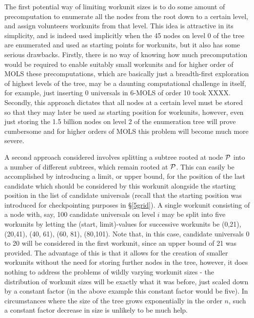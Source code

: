 The first potential way of limiting workunit sizes is to do some amount of precomputation to enumerate all the nodes from the root down to a certain level, and assign volunteers workunits from that level. This idea is attractive in its simplicity, and is indeed used implicitly when the 45 nodes on level 0 of the tree are enumerated and used as starting points for workunits, but it also has some serious drawbacks. Firstly, there is no way of knowing how much precomputation would be required to enable suitably small workunits and for higher order of MOLS these precomputations, which are basically just a breadth-first exploration of highest levels of the tree, may be a daunting computational challenge in itself, for example, just inserting 0 universals in 6-MOLS of order 10 took XXXX. Secondly, this approach dictates that all nodes at a certain level must be stored so that they may later be used as starting position for workunits, however, even just storing the 1.5 billion nodes on level 2 of the enumeration tree will prove cumbersome and for higher orders of MOLS this problem will become much more severe. %

A second approach considered involves splitting a subtree rooted at node $\mathcal{P}$ into a number of different subtrees, which remain rooted at $\mathcal{P}$. This can easily be accomplished by introducing a limit, or upper bound, for the position of the last candidate which should be considered by this workunit alongside the starting position in the list of candidate universals (recall that the starting position was introduced for checkpointing purposes in \S\ref{5grid}). A single workunit consisting of a node with, say, 100 candidate universals on level $i$ may be split into five workunits by letting the (start, limit)-values for successive workunits be (0,21), (20,41), (40, 61), (60, 81), (80,101). Note that, in this case, candidate universals 0 to 20 will be considered in the first workunit, since an upper bound of 21 was provided. The advantage of this is that it allows for the creation of smaller workunits without the need for storing further nodes in  the tree, however, it does nothing to address the problems of wildly varying workunit sizes - the distribution of workunit sizes will be exactly what it was before, just scaled down by a constant factor (in the above example this constant factor would be five). In circumstances where the size of the tree grows exponentially in the order $n$, such a constant factor decrease in size is unlikely to be much help.

